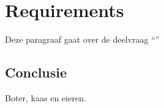 \chapter{Requirements}

\label{Chapter7}

Deze paragraaf gaat over de deelvraag \enquote{\deelrequirements}

\section{Conclusie}

Boter, kaas en eieren.